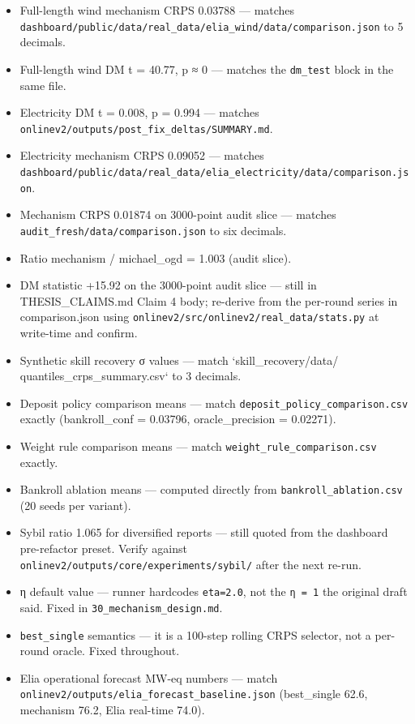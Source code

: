 \documentclass[11pt,a4paper,openany]{report}
\begin{document}
\begin{itemize}
  \item [x] Full-length wind mechanism CRPS 0.03788 — matches
    \texttt{dashboard/public/data/real\_data/elia\_wind/data/comparison.json}
    to 5 decimals.
  \item [x] Full-length wind DM t = 40.77, p ≈ 0 — matches the \texttt{dm\_test}
    block in the same file.
  \item [x] Electricity DM t = 0.008, p = 0.994 — matches
    \texttt{onlinev2/outputs/post\_fix\_deltas/SUMMARY.md}.
  \item [x] Electricity mechanism CRPS 0.09052 — matches
    \texttt{dashboard/public/data/real\_data/elia\_electricity/data/comparison.json}.
  \item [x] Mechanism CRPS 0.01874 on 3000-point audit slice — matches
    \texttt{audit\_fresh/data/comparison.json} to six decimals.
  \item [x] Ratio mechanism / michael\_ogd = 1.003 (audit slice).
  \item [ ] DM statistic +15.92 on the 3000-point audit slice — still in
    THESIS\_CLAIMS.md Claim 4 body; re-derive from the per-round series
    in comparison.json using \texttt{onlinev2/src/onlinev2/real\_data/stats.py}
    at write-time and confirm.
  \item [x] Synthetic skill recovery σ values — match `skill\_recovery/data/
    quantiles\_crps\_summary.csv` to 3 decimals.
  \item [x] Deposit policy comparison means — match
    \texttt{deposit\_policy\_comparison.csv} exactly (bankroll\_conf = 0.03796,
    oracle\_precision = 0.02271).
  \item [x] Weight rule comparison means — match
    \texttt{weight\_rule\_comparison.csv} exactly.
  \item [x] Bankroll ablation means — computed directly from
    \texttt{bankroll\_ablation.csv} (20 seeds per variant).
  \item [ ] Sybil ratio 1.065 for diversified reports — still quoted from
    the dashboard pre-refactor preset. Verify against
    \texttt{onlinev2/outputs/core/experiments/sybil/} after the next re-run.
  \item [x] η default value — runner hardcodes \texttt{eta=2.0}, not the \texttt{η = 1}
    the original draft said. Fixed in \texttt{30\_mechanism\_design.md}.
  \item [x] \texttt{best\_single} semantics — it is a 100-step rolling CRPS
    selector, not a per-round oracle. Fixed throughout.
  \item [x] Elia operational forecast MW-eq numbers — match
    \texttt{onlinev2/outputs/elia\_forecast\_baseline.json} (best\_single 62.6,
    mechanism 76.2, Elia real-time 74.0).
\end{itemize}
\end{document}
